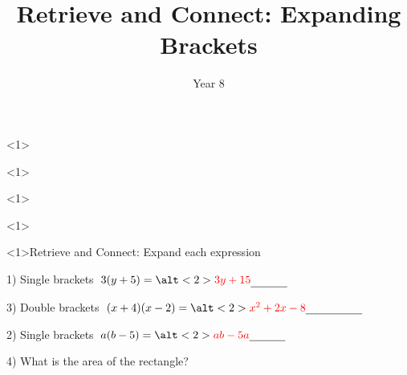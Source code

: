 \documentclass{beamer}
\title{Retrieve and Connect: Expanding Brackets}
\author{Year 8}
\date{}
\newcommand{\ablank}[1]{%
  \alt<2>{\textcolor{red}{#1}}{\underline{\phantom{#1}}}%
}
\newcommand{\ashow}[1]{\uncover<2->{\textcolor{red}{\small #1}}}
\newcommand{\ashowq}[1]{\alt<2->{\textcolor{red}{\small #1}}{?}}
\begin{document}
\begin{frame}<1>
  \titlepage
\end{frame}
\begin{frame}<1>
  \titlepage
\end{frame}
\begin{frame}<1>
  \titlepage
\end{frame}
\begin{frame}<1>
  \titlepage
\end{frame}

\begin{frame}<1>{Retrieve and Connect: Expand each expression}
\begin{minipage}[t]{0.48\textwidth}
  \begin{block}{1) Single brackets}
    \Large \(\;3(y+5)=\ablank{3y+15}\)
  \end{block}
  \vspace{0.5em}
  \begin{block}{3) Double brackets}
    \Large \(\;(x+4)(x-2)=\ablank{x^2+2x-8}\)
  \end{block}
\end{minipage}\hfill
\begin{minipage}[t]{0.48\textwidth}
  \begin{block}{2) Single brackets}
    \Large \(\; a(b-5)=\ablank{ab-5a}\)
  \end{block}
  \vspace{0.5em}
  \begin{block}{4) What is the area of the rectangle?}
    \par\vspace{0.5em}
    \ashow{Area = \(x(f+6)\)}
  \end{block}
\end{minipage}
\end{frame}
\end{document}
